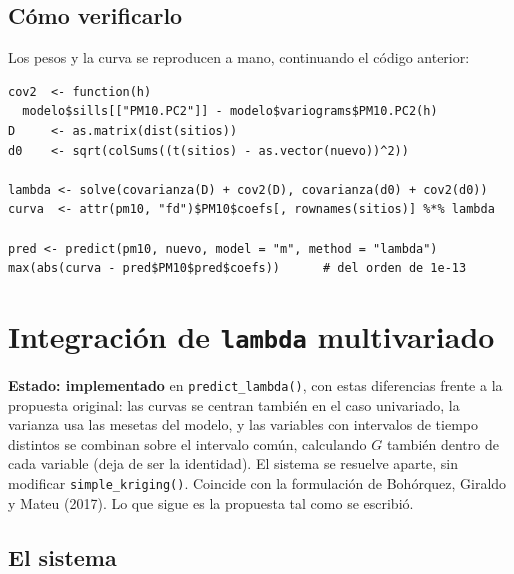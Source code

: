 \documentclass[11pt,a4paper]{article}
\newcommand{\code}[1]{\texttt{#1}}
\begin{document}
\subsection{Cómo verificarlo}

Los pesos y la curva se reproducen a mano, continuando el código anterior:

{\small
\begin{verbatim}
cov2  <- function(h)
  modelo$sills[["PM10.PC2"]] - modelo$variograms$PM10.PC2(h)
D     <- as.matrix(dist(sitios))
d0    <- sqrt(colSums((t(sitios) - as.vector(nuevo))^2))

lambda <- solve(covarianza(D) + cov2(D), covarianza(d0) + cov2(d0))
curva  <- attr(pm10, "fd")$PM10$coefs[, rownames(sitios)] %*% lambda

pred <- predict(pm10, nuevo, model = "m", method = "lambda")
max(abs(curva - pred$PM10$pred$coefs))      # del orden de 1e-13
\end{verbatim}
}

\section{Integración de \code{lambda} multivariado}

\noindent
\textbf{Estado: implementado} en \code{predict\_lambda()}, con estas
diferencias frente a la propuesta original: las curvas se centran también en
el caso univariado, la varianza usa las mesetas del modelo, y las variables con
intervalos de tiempo distintos se combinan sobre el intervalo común, calculando
$G$ también dentro de cada variable (deja de ser la identidad). El sistema se
resuelve aparte, sin modificar \code{simple\_kriging()}. Coincide con la
formulación de Bohórquez, Giraldo y Mateu (2017). Lo que sigue es la propuesta
tal como se escribió.

\subsection{El sistema}
\end{document}
